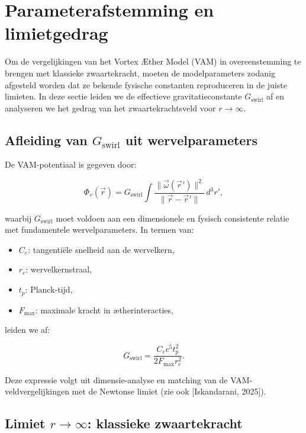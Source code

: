 \section{Parameterafstemming en limietgedrag}\label{sec:appendix_6}

Om de vergelijkingen van het Vortex Æther Model (VAM) in overeenstemming te brengen met klassieke zwaartekracht, moeten de modelparameters zodanig afgesteld worden dat ze bekende fysische constanten reproduceren in de juiste limieten. In deze sectie leiden we de effectieve gravitatieconstante $G_\text{swirl}$ af en analyseren we het gedrag van het zwaartekrachtsveld voor $r \to \infty$.

\subsection{Afleiding van $G_\text{swirl}$ uit wervelparameters}

De VAM-potentiaal is gegeven door:

\begin{equation}
\Phi_v(\vec{r}) = G_\text{swirl} \int \frac{\|\vec{\omega}(\vec{r}')\|^2}{\|\vec{r} - \vec{r}'\|} \, d^3r',
\end{equation}

waarbij $G_\text{swirl}$ moet voldoen aan een dimensionele en fysisch consistente relatie met fundamentele wervelparameters. In termen van:

\begin{itemize}
  \item $C_e$: tangentiële snelheid aan de wervelkern,
  \item $r_c$: wervelkernstraal,
  \item $t_p$: Planck-tijd,
  \item $F_\text{max}$: maximale kracht in ætherinteracties,
\end{itemize}

leiden we af:

\begin{equation}
G_\text{swirl} = \frac{C_e c^5 t_p^2}{2 F_\text{max} r_c^2}.
\end{equation}

Deze expressie volgt uit dimensie-analyse en matching van de VAM-veldvergelijkingen met de Newtonse limiet (zie ook [Iskandarani, 2025]).

\subsection{Limiet $r \to \infty$: klassieke zwaartekracht}

